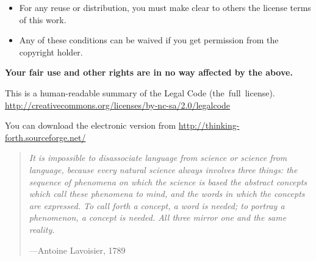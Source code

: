 \documentclass[10pt,american,pdftex]{book}
\begin{document}
\begin{itemize}
\item For any reuse or distribution, you must make clear to others the
license terms of this work.
 
\item Any of these conditions can be waived if you get permission from the copyright holder.
\end{itemize}

\begin{center}
\textbf{Your fair use and other rights are in no way affected by the above.}

\medskip
This is a human-readable summary of the Legal Code
{\def\UrlLeft#1\UrlRight{(the\ full\ license).}
\url{http://creativecommons.org/licenses/by-nc-sa/2.0/legalcode}}

\bigskip
\vfill
You can download the electronic version from
\url{http://thinking-forth.sourceforge.net/}


\end{center}


\cleardoublepage

\vspace*{100pt}
\begin{quotation}
\noindent\emph{%
It is impossible to disassociate language from science or science from
language, because every natural science always involves three things:
the sequence of phenomena on which the science is based the abstract
concepts which call these phenomena to mind, and the words in which
the concepts are expressed. To call forth a concept, a word is needed;
to portray a phenomenon, a concept is needed. All three mirror one and
the same reality.}

\begin{flushright}
---Antoine Lavoisier, 1789
\end{flushright}
\end{quotation}


\cleardoublepage
\pagestyle{headings}
\tableofcontents
\makeatletter
\renewcommand\numberline[1]{\hb@xt@\@tempdima{#1\hfil}}
\makeatother
\setcounter{tocdepth}{4}
\sectionlabelfalse


\vfill\pagebreak
\sectionlabeltrue
\setcounter{sectionlr}{4}
\setcounter{page}{1}














\cleardoublepage
\printindex
\end{document}
